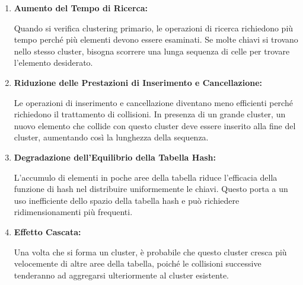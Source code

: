 \begin{enumerate}
    \item \textbf{Aumento del Tempo di Ricerca:}

    Quando si verifica clustering primario, le operazioni di ricerca richiedono più tempo perché più elementi devono essere esaminati. Se molte chiavi si trovano nello stesso cluster, bisogna scorrere una lunga sequenza di celle per trovare l'elemento desiderato.

    \item \textbf{Riduzione delle Prestazioni di Inserimento e Cancellazione:}

    Le operazioni di inserimento e cancellazione diventano meno efficienti perché richiedono il trattamento di collisioni. In presenza di un grande cluster, un nuovo elemento che collide con questo cluster deve essere inserito alla fine del cluster, aumentando così la lunghezza della sequenza.
    
    \item \textbf{Degradazione dell'Equilibrio della Tabella Hash:}

    L'accumulo di elementi in poche aree della tabella riduce l'efficacia della funzione di hash nel distribuire uniformemente le chiavi. Questo porta a un uso inefficiente dello spazio della tabella hash e può richiedere ridimensionamenti più frequenti.
    
    \item \textbf{Effetto Cascata:}

    Una volta che si forma un cluster, è probabile che questo cluster cresca più velocemente di altre aree della tabella, poiché le collisioni successive tenderanno ad aggregarsi ulteriormente al cluster esistente.
\end{enumerate}

